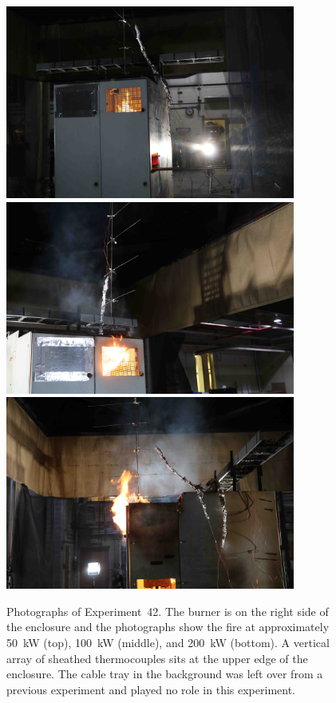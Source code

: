 \begin{figure}[p]
\centering
\includegraphics[height=2.50in]{../FIGURES/Test_42_start} \\
\includegraphics[height=2.50in]{../FIGURES/Test_42_rear} \\
\includegraphics[height=2.50in]{../FIGURES/Test_42_side}
\caption[Photographs of Experiment~42]{Photographs of Experiment~42. The burner is on the right side of the enclosure and the photographs show the fire at approximately 50~kW (top), 100~kW (middle), and 200~kW (bottom). A vertical array of sheathed thermocouples sits at the upper edge of the enclosure. The cable tray in the background was left over from a previous experiment and played no role in this experiment. }
\label{fig:Test_42_photos}
\end{figure}


